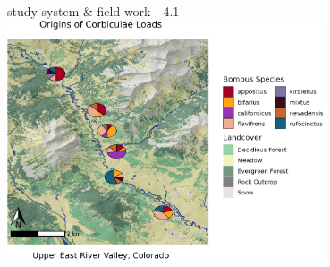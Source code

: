 \documentclass[
  ignorenonframetext,
]{beamer}
\begin{document}
\begin{frame}{study system \& field work - 4.1}
\protect\hypertarget{study-system-field-work---4.1}{}
\includegraphics[width=0.7\textwidth,height=\textheight]{../graphics/plots/siteMaps.png}
\end{frame}
\end{document}
